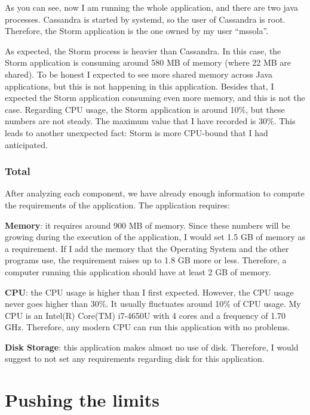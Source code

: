 As you can see, now I am running the whole application, and there are two java
processes. Cassandra is started by systemd, so the user of Cassandra is root.
Therefore, the Storm application is the one owned by my user ``mssola''.

As expected, the Storm process is heavier than Cassandra. In this case, the
Storm application is consuming around 580 MB of memory (where 22 MB are
shared). To be honest I expected to see more shared memory across Java
applications, but this is not happening in this application. Besides that, I
expected the Storm application consuming even more memory, and this is not the
case. Regarding CPU usage, the Storm application is around 10\%, but these
numbers are not steady. The maximum value that I have recorded is 30\%. This
leads to another unexpected fact: Storm is more CPU-bound that I had
anticipated.

\subsubsection*{Total}

After analyzing each component, we have already enough information to compute
the requirements of the application. The application requires:

\mylist
  \item {\bf Memory}: it requires around 900 MB of memory. Since these numbers
will be growing during the execution of the application, I would set 1.5 GB of
memory as a requirement. If I add the memory that the Operating System and the
other programs use, the requirement raises up to 1.8 GB more or less.
Therefore, a computer running this application should have at least 2 GB of
memory.
  \item {\bf CPU}: the CPU usage is higher than I first expected. However, the
CPU usage never goes higher than 30\%. It usually fluctuates around 10\% of CPU
usage. My CPU is an Intel(R) Core(TM) i7-4650U with 4 cores and a frequency of
1.70 GHz. Therefore, any modern CPU can run this application with no problems.
  \item {\bf Disk Storage}: this application makes almost no use of disk.
Therefore, I would suggest to not set any requirements regarding disk for this
application.
\mylistend

\section{Pushing the limits}
\label{sec:limits}

